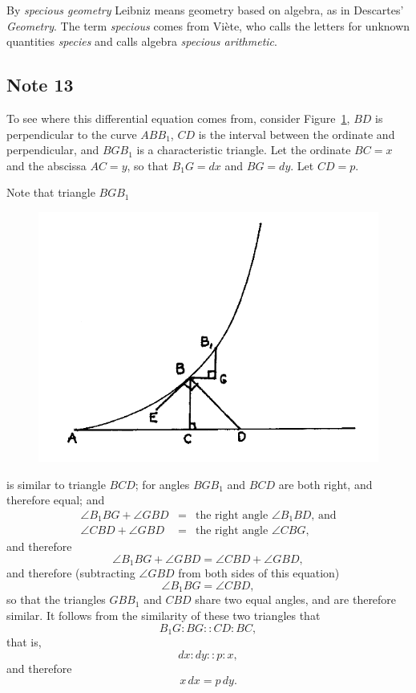 \documentclass[polutonikogreek,english,twoside,openright]{article}
\begin{document}
By {\em specious geometry} Leibniz means geometry based on algebra, as
in Descartes' {\em Geometry}.  The term {\em specious} comes from
Vi\`{e}te, who calls the letters for unknown quantities {\em species}
and calls algebra {\em specious arithmetic}.

\subsection*{Note 13}
\label{crg13}
To see where this differential equation comes from, consider
Figure~\ref{barrow1A}, $BD$ is perpendicular to the curve $ABB_1$,
$CD$ is the interval between the ordinate and perpendicular, and
$BGB_1$ is a characteristic triangle.  Let the ordinate $BC = x$ and
the abscissa $AC = y$, so that $B_1G =dx$ and $BG = dy$.  Let
$CD = p$.

Note that triangle $BGB_1$ 
\begin{figure}[htp]
\begin{center}
\includegraphics[width=.75\textwidth]{fig/Figure40}
\caption{}
\label{barrow1A}
\end{center}
\end{figure}
is similar to triangle $BCD$; for angles $BGB_1$ and $BCD$ are both right, and therefore equal; and 
\begin{eqnarray*}
\angle B_1BG + \angle GBD & = & \mbox{the right angle } \angle B_1BD \mbox{, and}\\
\angle CBD + \angle GBD & = &  \mbox{the right angle } \angle CBG,
\end{eqnarray*}
and therefore 
$$\angle B_1BG + \angle GBD = \angle CBD + \angle GBD,$$
and therefore (subtracting  $\angle GBD$ from both sides of this equation)
$$\angle B_1BG=  \angle CBD,$$
so that the triangles $GBB_1$ and $CBD$ share two equal angles, and
are therefore similar.  It follows from the similarity of these two
triangles that
$$B_1G\!:\! BG :: CD \!:\! BC,$$
that is,
$$dx\!:\!dy :: p\!:\!x,$$
and therefore 
$$x\,dx = p\,dy.$$
\end{document}
